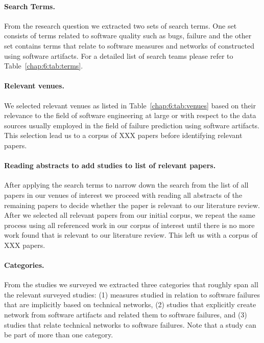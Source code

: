\paragraph{Search Terms.} From the research question we extracted two sets of search terms.
One set consists of terms related to software quality such as bugs, failure and the other set contains terms that relate to software measures and networks of constructed using software artifacts.
For a detailed list of search teams please refer to Table~\ref{chap:6:tab:terms}.

\paragraph{Relevant venues.} We selected relevant venues as listed in Table~\ref{chap:6:tab:venues} based on their relevance to the field of software engineering at large or with respect to the data sources usually employed in the field of failure prediction using software artifacts.
This selection lead us to a corpus of XXX papers before identifying relevant papers.

\paragraph{Reading abstracts to add studies to list of relevant papers.} After applying the search terms to narrow down the search from the list of all papers in our venues of interest we proceed with reading all abstracts of the remaining papers to decide whether the paper is relevant to our literature review.
%
After we selected all relevant papers from our initial corpus, we repeat the same process using all referenced work in our corpus of interest until there is no more work found that is relevant to our literature review.
This left us with a corpus of XXX papers.

\paragraph{Categories.} From the studies we surveyed we extracted three categories that roughly span all the relevant surveyed studies:
(1) measures studied in relation to software failures that are implicitly based on technical networks,
(2) studies that explicitly create network from software artifacts and related them to software failures,
and (3) studies that relate technical networks to software failures.
Note that a study can be part of more than one category.

